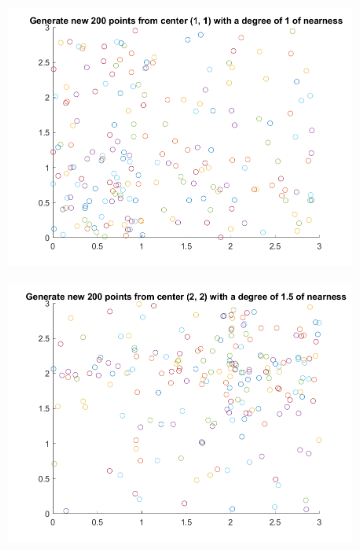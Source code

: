 \begin{figure}
  \begin{subfigure}[b]{0.4\textwidth}
    \includegraphics[width=\textwidth]{img/cbr-2}
    \label{fig:cbr-2}
  \end{subfigure}
  \begin{subfigure}[b]{0.4\textwidth}
    \includegraphics[width=\textwidth]{img/cbr-3}
    \label{fig:cbr-3}
  \end{subfigure}


\end{figure}
